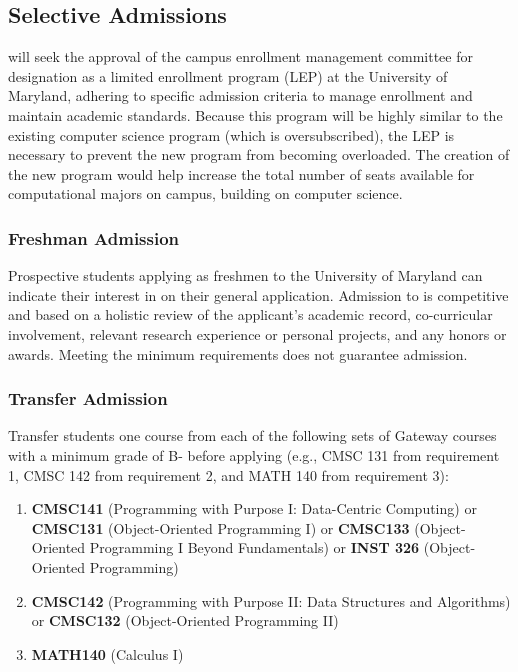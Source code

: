 \subsection{Selective Admissions}

\name{} will seek the approval of the campus enrollment management committee for designation as a limited enrollment program (LEP) at the University of Maryland, adhering to specific admission criteria to manage enrollment and maintain academic standards.
%
Because this program will be highly similar to the existing computer science program (which is oversubscribed), the LEP is necessary to prevent the new program from becoming overloaded.
%
The creation of the new program would help increase the total number of seats available for computational majors on campus, building on computer science.

\subsubsection*{Freshman Admission}
Prospective students applying as freshmen to the University of Maryland can indicate their interest in \name{} on their general application. Admission to \short{} is competitive and based on a holistic review of the applicant's academic record, co-curricular involvement, relevant research experience or personal projects, and any honors or awards. Meeting the minimum requirements does not guarantee admission.

\subsubsection*{Transfer Admission}
Transfer students one course from each of the following sets of Gateway courses with a minimum grade of B- before applying (e.g., CMSC 131 from requirement 1, CMSC 142 from requirement 2, and MATH 140 from requirement 3):
\begin{enumerate}
    \item \textbf{CMSC141} (Programming with Purpose I: Data-Centric Computing) or \textbf{CMSC131} (Object-Oriented Programming I) or \textbf{CMSC133} (Object-Oriented Programming I Beyond Fundamentals) or \textbf{INST 326} (Object-Oriented Programming)
    \item \textbf{CMSC142} (Programming with Purpose II: Data Structures and Algorithms) or \textbf{CMSC132} (Object-Oriented Programming II)
    \item \textbf{MATH140} (Calculus I) 
\end{enumerate}

